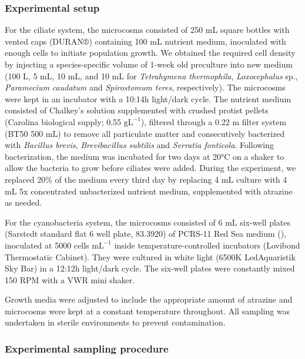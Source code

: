 \documentclass[
  letterpaper,
  DIV=11,
  numbers=noendperiod]{scrartcl}
\begin{document}
\subsubsection{Experimental setup}\label{experimental-setup}

For the ciliate system, the microcosms consisted of 250 mL square
bottles with vented caps (DURAN®) containing 100 mL nutrient medium,
inoculated with enough cells to initiate population growth. We obtained
the required cell density by injecting a species-specific volume of
1-week old preculture into new medium (100 \textmu L, 5 mL, 10 mL, and
10 mL for \emph{Tetrahymena thermophila}, \emph{Loxocephalus} sp.,
\emph{Paramecium caudatum} and \emph{Spirostomum teres}, respectively).
The microcosms were kept in an incubator with a 10:14h light/dark cycle.
The nutrient medium consisted of Chalkey's solution supplemented with
crushed protist pellets (Carolina biological supply; 0.55
\(\mathrm{gL}^{-1}\)), filtered through a 0.22 \textmu m filter system
(BT50 500 mL) to remove all particulate matter and consecutively
bacterized with \emph{Bacillus brevis}, \emph{Brevibacillus subtilis}
and \emph{Serratia fonticola}. Following bacterization, the medium was
incubated for two days at 20°C on a shaker to allow the bacteria to grow
before ciliates were added. During the experiment, we replaced 20\% of
the medium every third day by replacing 4 mL culture with 4 mL 5x
concentrated unbacterized nutrient medium, supplemented with atrazine as
needed.

For the cyanobacteria system, the microcosms consisted of 6 mL six-well
plates (Sarstedt standard flat 6 well plate, 83.3920) of PCRS-11 Red Sea
medium (), inoculated at
5000 cells \(\mathrm{mL}^{-1}\) inside temperature-controlled incubators
(Lovibond Thermostatic Cabinet). They were cultured in white light
(6500K LedAquaristik Sky Bar) in a 12:12h light/dark cycle. The six-well
plates were constantly mixed 150 RPM with a VWR mini shaker.

Growth media were adjusted to include the appropriate amount of atrazine
and microcosms were kept at a constant temperature throughout. All
sampling was undertaken in sterile environments to prevent
contamination.

\subsubsection{Experimental sampling
procedure}\label{experimental-sampling-procedure}
\end{document}
